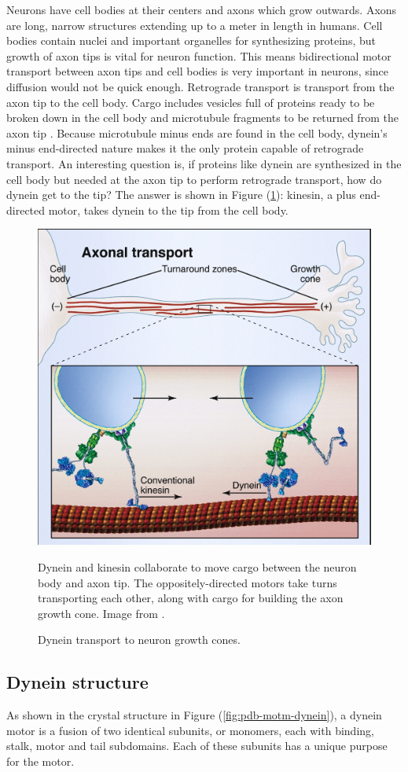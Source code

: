 \documentclass[
11pt, %
english, %
singlespacing, %
headsepline, %
chapterinoneline, %
]{MastersDoctoralThesis} %
\begin{document}
Neurons have cell bodies at their centers and axons which grow outwards. Axons are long, narrow structures extending up to a meter in length in humans. Cell bodies contain nuclei and important organelles for synthesizing proteins, but growth of axon tips is vital for neuron function. This means bidirectional motor transport between axon tips and cell bodies is very important in neurons, since diffusion would not be quick enough. Retrograde transport is transport from the axon tip to the cell body. Cargo includes vesicles full of proteins ready to be broken down in the cell body and microtubule fragments to be returned from the axon tip \cite{neuroanatomy}. Because microtubule minus ends are found in the cell body, dynein's minus end-directed nature makes it the only protein capable of retrograde transport. An interesting question is, if proteins like dynein are synthesized in the cell body but needed at the axon tip to perform retrograde transport, how do dynein get to the tip? The answer is shown in Figure (\ref{retrograde-transport}): kinesin, a plus end-directed motor, takes dynein to the tip from the cell body.\\

\begin{figure}[h]
  \centering
  \includegraphics[width=.65\textwidth,keepaspectratio]{../../figures/retrograde_transport.jpg}
  \caption{Dynein transport to neuron growth cones.}{Dynein and kinesin collaborate to move cargo between the neuron body and axon tip. The oppositely-directed motors take turns transporting each other, along with cargo for building the axon growth cone. Image from \cite{valetoolbox}.}
  \label{retrograde-transport}
\end{figure}

\subsection{Dynein structure}
As shown in the crystal structure in Figure (\ref{fig:pdb-motm-dynein}), a dynein motor is a fusion of two identical subunits, or monomers, each with binding, stalk, motor and tail subdomains. Each of these subunits has a unique purpose for the motor.\\
\end{document}

